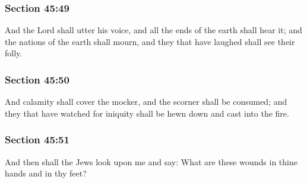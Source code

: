 	\subsubsection{Section 45:49} %
		\label{DC45-49}

		And the Lord shall utter his voice, and all the ends of the earth shall hear it; and the nations of the earth shall mourn, and they that have laughed shall see their folly.


	\subsubsection{Section 45:50} %
		\label{DC45-50}

		And calamity shall cover the mocker, and the scorner shall be consumed; and they that have watched for iniquity shall be hewn down and cast into the fire.


	\subsubsection{Section 45:51} %
		\label{DC45-51}

		And then shall the Jews look upon me and say: What are these wounds in thine hands and in thy feet?


